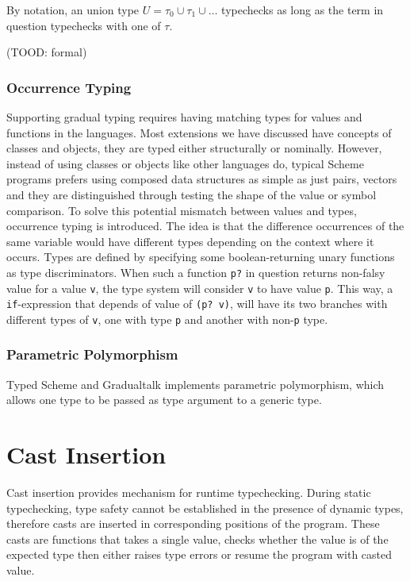 By notation, an union type $U = \tau_0 \cup \tau_1 \cup \ldots$ typechecks as long as the term in question
typechecks with one of $\tau$.

(TOOD: formal)

\subsubsection{Occurrence Typing}


Supporting gradual typing requires having matching types for values and functions in the languages.
Most extensions we have discussed have concepts of classes and objects, they are typed either
structurally or nominally.
However, instead of using classes or objects like other languages do,
typical Scheme programs prefers using composed data structures as simple as just pairs, vectors
and they are distinguished through testing the shape of the value or symbol comparison.
To solve this potential mismatch between values and types, occurrence typing is introduced.
The idea is that the difference occurrences of the same variable would have different types
depending on the context where it occurs.
Types are defined by specifying some boolean-returning unary functions as type discriminators.
When such a function \texttt{p?} in question returns non-falsy value for a value \texttt{v},
the type system will consider \texttt{v} to have value \texttt{p}.
This way, a \texttt{if}-expression that depends of value of \texttt{(p? v)},
will have its two branches with different types of \texttt{v}, one with type \texttt{p}
and another with non-\texttt{p} type.

\subsubsection{Parametric Polymorphism}

Typed Scheme and Gradualtalk implements parametric polymorphism, which allows
one type to be passed as type argument to a generic type.


\section{Cast Insertion}

Cast insertion provides mechanism for runtime typechecking.
During static typechecking, type safety cannot be established in the presence of dynamic types,
therefore casts are inserted in corresponding positions of the program. These casts are functions
that takes a single value, checks whether the value is of the expected type then either
raises type errors or resume the program with casted value.

